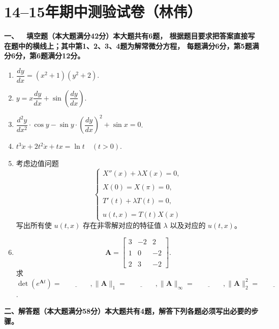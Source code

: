 \section{14--15年期中测验试卷（林伟）}
\textbf{一、\ \ 填空题（本大题满分42分）本大题共有6题，
根据题目要求把答案直接写在题中的横线上；其中第1、2、3、4题为解常微分方程，
每题满分6分，第5题满分6分，第6题满分12分。}
\begin{enumerate}
\item[1.] $\dfrac{dy}{dx}=(x^2+1)(y^2+2)$.

\item[2.] $y = x \dfrac{dy}{dx} + \sin\left(\dfrac{dy}{dx}\right)$.

\item[3.] $\dfrac{d^2 y}{dx^2} \cdot \cos y - \sin y \cdot \left(\dfrac{dy}{dx}\right)^2 + \sin x = 0$.

\item[4.] $t^3 \ddot{x} + 2t^2 \dot{x} + tx = \ln t \quad (t > 0)$.

\item[5.] 考虑边值问题
\[
\begin{cases}
X''(x) + \lambda X(x) = 0, \\ \\
X(0) = X(\pi) = 0,\\ \\
T'(t)+\lambda T(t) = 0,\\ \\
u(t,x) = T(t)X(x)
\end{cases}
\]
写出所有使 $u(t,x)$ 存在非零解对应的特征值 $\lambda$ 以及对应的 $u(t,x)$。

\item[6.] \[
\boldsymbol{A} = \begin{bmatrix} 
3 & -2 & 2 \\ \\
1 & 0 & -2 \\ \\
2 & 3 & -2
\end{bmatrix}.
\]
求$\det(e^{\boldsymbol{A}t})=\underline{\qquad\qquad},\| \boldsymbol{A} \|_1=\underline{\qquad\qquad},
\| \boldsymbol{A} \|_\infty=\underline{\qquad\qquad},\| \boldsymbol{A} \|_2^2=\underline{\qquad\qquad}$.
\end{enumerate}
\textbf{二、解答题（本大题满分58分）本大题共有4题，解答下列各题必须写出必要的步骤。}
